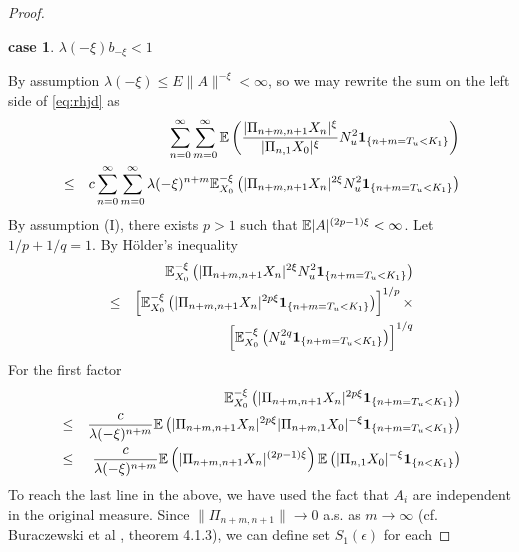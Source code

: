 \documentclass[aoas,preprint]{imsart}
\newtheorem{case}{case}
\numberwithin{equation}{section}
\theoremstyle{plain}
\begin{document}
\begin{proof}
\begin{case}
    $\lambda(-\xi) b_{-\xi} < 1$
  \end{case}
  By assumption $\lambda(-\xi) \leq E\|A\|^{-\xi} < \infty$, so
  we may rewrite the sum on the left side of \eqref{eq:rhjd} as
  \begin{eqnarray}
    &&
    \sum_{n=0}^\infty
    \sum_{m=0}^\infty
    \mathbb{E} \left(
      {
        | \Pi_{n+m,n+1} X_n |^{\xi}
        \over
        | \Pi_{n,1} X_0 |^{\xi}
      }
      N_u^2
      \mathbf{1}_{\{n+m = T_u < K_1\}}
    \right) \label{eq:kpdf} \\
    &\leq&
    c
    \sum_{n=0}^\infty
    \sum_{m=0}^\infty
    \lambda(-\xi)^{n+m}
    \mathbb{E}_{X_0}^{-\xi} \left(
      | \Pi_{n+m,n+1} X_n |^{2 \xi}
      N_u^2
      \mathbf{1}_{\{n+m = T_u < K_1\}}
    \right) \nonumber
  \end{eqnarray}
  By assumption (I), there exists $p > 1$ such that
  $\mathbb{E} |A|^{(2p - 1)\xi} < \infty$. Let $1/p + 1/q = 1$. By
  H\"older's inequality
  \begin{eqnarray}
    &&
    \mathbb{E}_{X_0}^{-\xi} \left(
      | \Pi_{n+m,n+1} X_n |^{2 \xi}
      N_u^2
      \mathbf{1}_{\{n+m = T_u < K_1\}}
    \right)  \label{eq:hyyu} \\
    &\leq&
    \left[
      \mathbb{E}_{X_0}^{-\xi} \left(
        | \Pi_{n+m,n+1} X_n|^{2 p\xi}
        \mathbf{1}_{\{n+m = T_u < K_1\}}
      \right)
    \right]^{1/p} \nonumber \times \\
    &&
    \left[
      \mathbb{E}_{X_0}^{-\xi} \left(
        N_u^{2q}
        \mathbf{1}_{\{n+m = T_u < K_1\}}
      \right)
    \right]^{1/q}
    \nonumber
  \end{eqnarray}
  For the first factor
  \begin{eqnarray}
    &&
    \mathbb{E}_{X_0}^{-\xi} \left(
      | \Pi_{n+m,n+1} X_n|^{2 p\xi}
      \mathbf{1}_{\{n+m = T_u < K_1\}}
    \right) \label{eq:hfry} \\
    &\leq&
    {c \over \lambda(-\xi)^{n+m}}
    \mathbb{E} \left(
      |\Pi_{n+m,n+1} X_n|^{2p\xi}
      |\Pi_{n+m, 1} X_{0}|^{-\xi}
      \mathbf{1}_{\{n+m = T_u < K_1\}}
    \right) \nonumber \\
    &\leq&
    {c \over \lambda(-\xi)^{n+m}}
    \mathbb{E} \left(
      |\Pi_{n+m,n+1} X_n|^{(2p-1)\xi}
    \right)
    \mathbb{E} \left(
      |\Pi_{n,1} X_0|^{-\xi}
      \mathbf{1}_{\{n < K_1\}}
    \right) \nonumber
  \end{eqnarray}
  To reach the last line in the above, we have used the fact that
  $A_i$ are independent in the original measure.
  Since $\| \Pi_{n+m,n+1} \| \to 0$ a.s. as $m \to \infty$
  (cf. Buraczewski et al \cite{buraczewski:damek:mikosch:2016},
  theorem 4.1.3), we can define set $S_1(\epsilon)$ for each

\end{proof}
\end{document}

